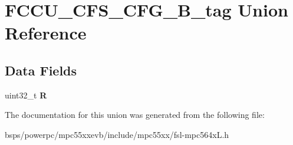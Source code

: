 \hypertarget{unionFCCU__CFS__CFG__32B__tag}{}\section{F\+C\+C\+U\+\_\+\+C\+F\+S\+\_\+\+C\+F\+G\+\_\+B\+\_\+tag Union Reference}
\label{unionFCCU__CFS__CFG__32B__tag}
\subsection*{Data Fields}
\begin{DoxyCompactItemize}
\item 
\mbox{\label{unionFCCU__CFS__CFG__32B__tag_a81e9f5ed2a09ecd5df1979eb24523c33}} 
uint32\+\_\+t {\bfseries R}
\end{DoxyCompactItemize}


The documentation for this union was generated from the following file\+:\begin{DoxyCompactItemize}
\item 
bsps/powerpc/mpc55xxevb/include/mpc55xx/fsl-\/mpc564x\+L.\+h\end{DoxyCompactItemize}
